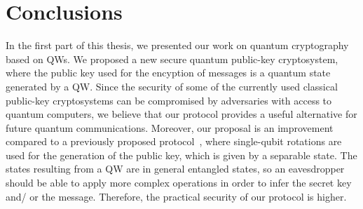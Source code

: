 %
%
%
%
\chapter{Conclusions}
In the first part of this thesis, we presented our work on quantum cryptography based on QWs. We proposed a new secure quantum public-key cryptosystem, where the public key used for the encyption of messages is a quantum state generated by a QW. Since the security of some of the currently used classical public-key cryptosystems can be compromised by adversaries with access to quantum computers, we believe that our protocol provides a useful alternative for future quantum communications. Moreover, our proposal is an improvement compared to a previously proposed protocol~\cite{nik:08}, where single-qubit rotations are used for the generation of the public key, which is given by a separable state. The states resulting from a QW are in general entangled states, so an eavesdropper should be able to apply more complex operations in order to infer the secret key and/ or the message. Therefore, the practical security of our protocol is higher.

